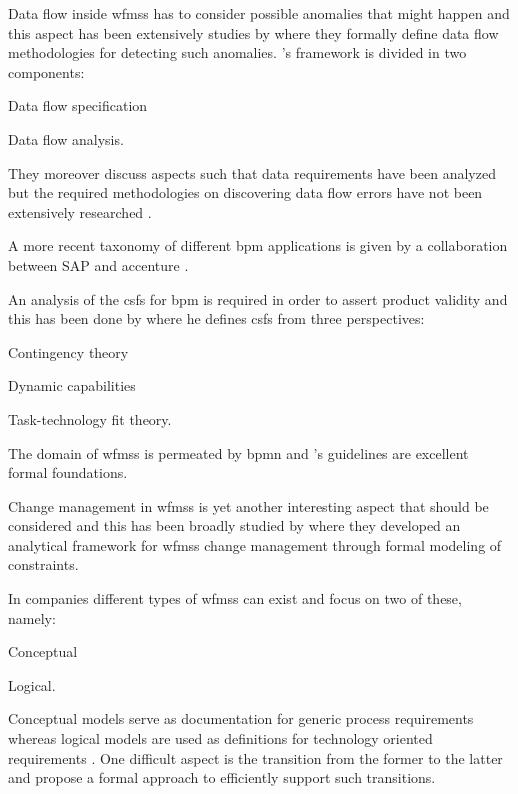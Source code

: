 Data flow inside \glspl{wfms} has to consider possible anomalies that might happen and this aspect has been extensively studies by \citet{Sun2006} where they formally define data flow methodologies for detecting such anomalies. \citet{Sun2006}'s framework is divided in two components:
\begin{enumerate*}
	\item Data flow specification
	\item Data flow analysis.
\end{enumerate*}
They moreover discuss aspects such that data requirements have been analyzed but the required methodologies on discovering data flow errors have not been extensively researched \citep{Sun2006}.

A more recent taxonomy of different \gls{bpm} applications is given by a collaboration between SAP and accenture \citep{EvolvedTechnologist2009}.

An analysis of the \glspl{csf} for \gls{bpm} is required in order to assert product validity and this has been done by \citet{Trkman2010} where he defines \glspl{csf} from three perspectives:
\begin{enumerate*}
	\item Contingency theory
	\item Dynamic capabilities
	\item Task-technology fit theory.
\end{enumerate*}

The domain of \glspl{wfms} is permeated by \gls{bpmn} and \citet{Silver2011}'s guidelines are excellent formal foundations.

Change management in \glspl{wfms} is yet another interesting aspect that should be considered and this has been broadly studied by \citet{Wang2011} where they developed an analytical framework for \glspl{wfms} change management through formal modeling of constraints.

In companies different types of \glspl{wfms} can exist and \citet{Fan2012} focus on two of these, namely:
\begin{enumerate*}
	\item Conceptual
	\item Logical.
\end{enumerate*}
Conceptual models serve as documentation for generic process requirements whereas logical models are used as definitions for technology oriented requirements \citep{Fan2012}. One difficult aspect is the transition from the former to the latter and \citet{Fan2012} propose a formal approach to efficiently support such transitions.

